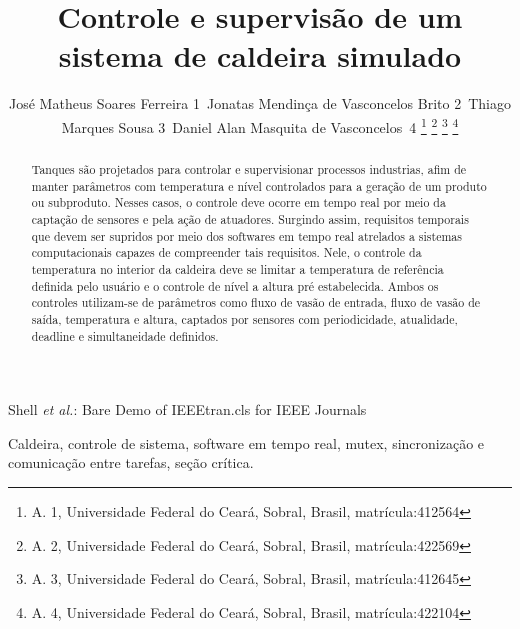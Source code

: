 \documentclass[journal]{IEEEtran}
\begin{document}
	
\title{Controle e supervisão de um sistema de caldeira simulado}

\author{José Matheus Soares Ferreira 1~Jonatas Mendinça de Vasconcelos Brito 2~Thiago Marques Sousa 3~Daniel Alan Masquita de Vasconcelos~4%
\thanks{A. 1, Universidade Federal do Ceará, Sobral, Brasil, matrícula:412564}%
\thanks{A. 2, Universidade Federal do Ceará, Sobral, Brasil, matrícula:422569}%
\thanks{A. 3, Universidade Federal do Ceará, Sobral, Brasil, matrícula:412645}%
\thanks{A. 4, Universidade Federal do Ceará, Sobral, Brasil, matrícula:422104}
}

%
{Shell \MakeLowercase{\textit{et al.}}: Bare Demo of IEEEtran.cls for IEEE Journals}


\maketitle

\begin{abstract}
Tanques são projetados para controlar e supervisionar processos industrias, afim de manter parâmetros com temperatura e nível controlados para a geração de um produto ou subproduto. Nesses casos, o controle deve ocorre em tempo real por meio da captação de sensores e pela ação de atuadores. Surgindo assim,  requisitos temporais que devem ser supridos por meio dos softwares em tempo real atrelados a sistemas computacionais capazes de compreender tais requisitos. Nele, o controle da temperatura no interior da caldeira deve se limitar a temperatura de referência definida pelo usuário e o controle de nível a altura pré estabelecida. Ambos os controles utilizam-se de parâmetros como fluxo de vasão de entrada, fluxo de vasão de saída, temperatura e altura, captados por sensores com periodicidade, atualidade, deadline e simultaneidade definidos.  
\end{abstract}

\begin{IEEEkeywords}
Caldeira, controle de sistema, software em tempo real, mutex, sincronização e comunicação entre tarefas, seção crítica.
\end{IEEEkeywords}
\end{document}
